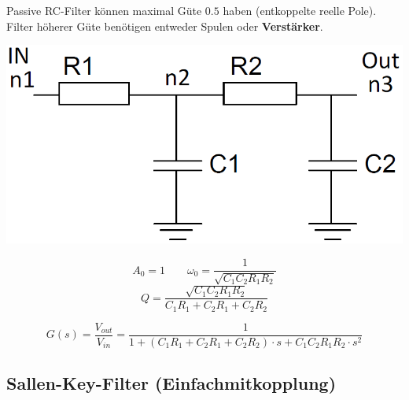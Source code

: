 Passive RC-Filter können maximal Güte $0.5$ haben (entkoppelte reelle Pole). Filter höherer Güte benötigen entweder
Spulen oder \textbf{Verstärker}.



\begin{minipage}[c]{0.4\columnwidth}
    \includegraphics[width=\columnwidth]{images/tiefpass_ordnung_2.png}
\end{minipage}
\hfill
\begin{minipage}[c]{0.58\columnwidth}
    $$ A_0 = 1 \qquad \omega_0 = \frac{1}{\sqrt{C_1 C_2 R_1 R_2}} $$
    $$ Q = \frac{\sqrt{C_1 C_2 R_1 R_2}}{C_1 R_1 + C_2 R_1 + C_2 R_2} $$
\end{minipage}
$$ G(s) = \frac{V_{out}}{V_{in}} = \frac{1}{1 + (C_1 R_1 + C_2 R_1 + C_2 R_2) \cdot s + C_1 C_2 R_1 R_2 \cdot s^2 } $$



\subsection{Sallen-Key-Filter (Einfachmitkopplung)}

